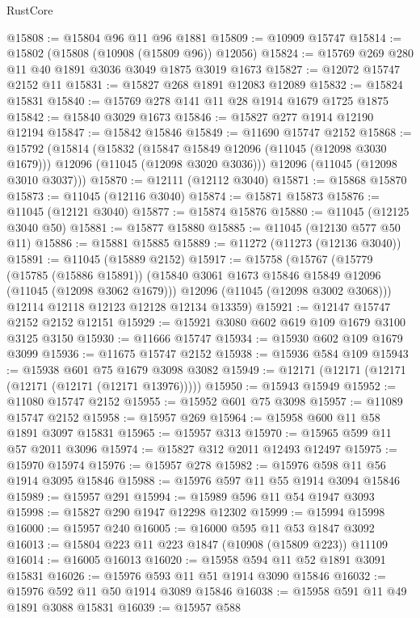 \begin{lexlean}{RustCore}
\begin{coremodule}
@15808 := @15804 @96 @11 @96 @1881
@15809 := @10909 @15747
@15814 := @15802 (@15808 (@10908 (@15809 @96)) @12056)
@15824 := @15769 @269 @280 @11 @40 @1891 @3036 @3049 @1875 @3019 @1673
@15827 := @12072 @15747 @2152 @11
@15831 := @15827 @268 @1891 @12083 @12089
@15832 := @15824 @15831
@15840 := @15769 @278 @141 @11 @28 @1914 @1679 @1725 @1875
@15842 := @15840 @3029 @1673
@15846 := @15827 @277 @1914 @12190 @12194
@15847 := @15842 @15846
@15849 := @11690 @15747 @2152
@15868 := @15792
    (@15814
      (@15832
        (@15847 @15849 @12096 (@11045 (@12098 @3030 @1679)))
        @12096
        (@11045 (@12098 @3020 @3036)))
      @12096
      (@11045 (@12098 @3010 @3037)))
@15870 := @12111 (@12112 @3040)
@15871 := @15868 @15870
@15873 := @11045 (@12116 @3040)
@15874 := @15871 @15873
@15876 := @11045 (@12121 @3040)
@15877 := @15874 @15876
@15880 := @11045 (@12125 @3040 @50)
@15881 := @15877 @15880
@15885 := @11045 (@12130 @577 @50 @11)
@15886 := @15881 @15885
@15889 := @11272 (@11273 (@12136 @3040))
@15891 := @11045 (@15889 @2152)
@15917 := @15758
    (@15767
      (@15779
        (@15785 (@15886 @15891))
        (@15840 @3061 @1673 @15846 @15849 @12096 (@11045 (@12098 @3062 @1679)))
        @12096
        (@11045 (@12098 @3002 @3068)))
      @12114
      @12118
      @12123
      @12128
      @12134
      @13359)
@15921 := @12147 @15747 @2152 @2152 @12151
@15929 := @15921 @3080 @602 @619 @109 @1679 @3100 @3125 @3150
@15930 := @11666 @15747
@15934 := @15930 @602 @109 @1679 @3099
@15936 := @11675 @15747 @2152
@15938 := @15936 @584 @109
@15943 := @15938 @601 @75 @1679 @3098 @3082
@15949 := @12171 (@12171 (@12171 (@12171 (@12171 (@12171 @13976)))))
@15950 := @15943 @15949
@15952 := @11080 @15747 @2152
@15955 := @15952 @601 @75 @3098
@15957 := @11089 @15747 @2152
@15958 := @15957 @269
@15964 := @15958 @600 @11 @58 @1891 @3097 @15831
@15965 := @15957 @313
@15970 := @15965 @599 @11 @57 @2011 @3096
@15974 := @15827 @312 @2011 @12493 @12497
@15975 := @15970 @15974
@15976 := @15957 @278
@15982 := @15976 @598 @11 @56 @1914 @3095 @15846
@15988 := @15976 @597 @11 @55 @1914 @3094 @15846
@15989 := @15957 @291
@15994 := @15989 @596 @11 @54 @1947 @3093
@15998 := @15827 @290 @1947 @12298 @12302
@15999 := @15994 @15998
@16000 := @15957 @240
@16005 := @16000 @595 @11 @53 @1847 @3092
@16013 := @15804 @223 @11 @223 @1847 (@10908 (@15809 @223)) @11109
@16014 := @16005 @16013
@16020 := @15958 @594 @11 @52 @1891 @3091 @15831
@16026 := @15976 @593 @11 @51 @1914 @3090 @15846
@16032 := @15976 @592 @11 @50 @1914 @3089 @15846
@16038 := @15958 @591 @11 @49 @1891 @3088 @15831
@16039 := @15957 @588

\end{coremodule}
\end{lexlean}
